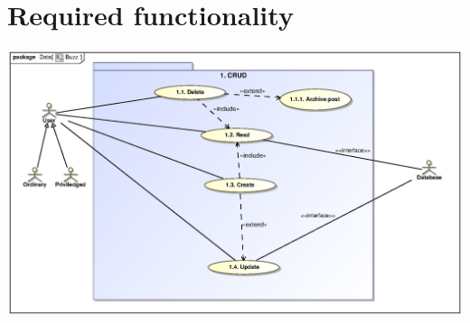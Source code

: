 \documentclass{scrreprt}
\begin{document}
\chapter{Required functionality} 							%
\includegraphics[scale=.9]{CRUDUSECASE.eps}\\
\end{document}
